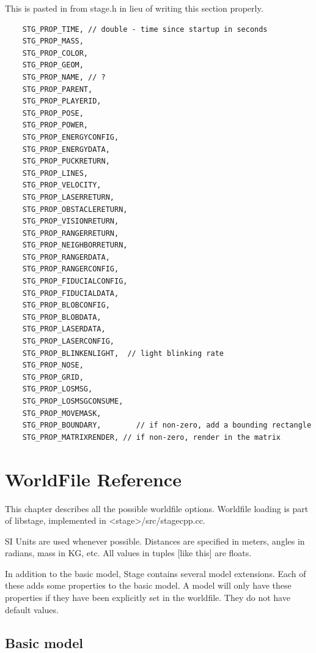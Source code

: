 \documentclass[letter,11pt,twoside]{report}
\begin{document}
This is pasted in from stage.h in lieu of writing this section properly.

\begin{verbatim}
    STG_PROP_TIME, // double - time since startup in seconds
    STG_PROP_MASS,
    STG_PROP_COLOR,
    STG_PROP_GEOM, 
    STG_PROP_NAME, // ?
    STG_PROP_PARENT, 
    STG_PROP_PLAYERID,
    STG_PROP_POSE,
    STG_PROP_POWER,
    STG_PROP_ENERGYCONFIG,
    STG_PROP_ENERGYDATA,
    STG_PROP_PUCKRETURN,
    STG_PROP_LINES,
    STG_PROP_VELOCITY, 
    STG_PROP_LASERRETURN,
    STG_PROP_OBSTACLERETURN,
    STG_PROP_VISIONRETURN,
    STG_PROP_RANGERRETURN, 
    STG_PROP_NEIGHBORRETURN,
    STG_PROP_RANGERDATA,
    STG_PROP_RANGERCONFIG,
    STG_PROP_FIDUCIALCONFIG,
    STG_PROP_FIDUCIALDATA,
    STG_PROP_BLOBCONFIG,
    STG_PROP_BLOBDATA,
    STG_PROP_LASERDATA,
    STG_PROP_LASERCONFIG,
    STG_PROP_BLINKENLIGHT,  // light blinking rate
    STG_PROP_NOSE,
    STG_PROP_GRID,
    STG_PROP_LOSMSG,
    STG_PROP_LOSMSGCONSUME,
    STG_PROP_MOVEMASK,
    STG_PROP_BOUNDARY,        // if non-zero, add a bounding rectangle
    STG_PROP_MATRIXRENDER, // if non-zero, render in the matrix
\end{verbatim}

\chapter{WorldFile Reference}

This chapter describes all the possible worldfile options. Worldfile
loading is part of libstage, implemented in <stage>/src/stagecpp.cc.

SI Units are used whenever possible. Distances are specified in
meters, angles in radians, mass in KG, etc. All values in tuples [like
this] are floats.

In addition to the basic model, Stage contains several model
extensions. Each of these adds some properties to the basic model. A
model will only have these properties if they have been explicitly set
 in the worldfile. They do not have default values.


\newpage
\section{Basic model}
\end{document}
